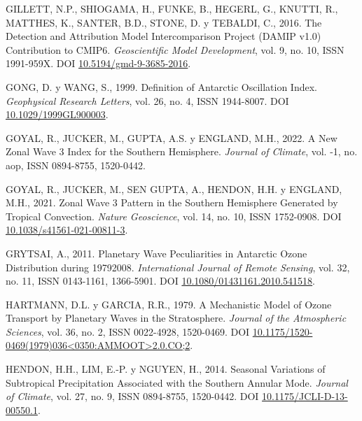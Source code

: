 \documentclass[12pt,oneside,a4paper]{reedthesis}
\newlength{\cslhangindent}
\newenvironment{CSLReferences}[2] %
 {%
  \setlength{\parindent}{0pt}
  \ifodd #1 \everypar{\setlength{\hangindent}{\cslhangindent}}\ignorespaces\fi
  \ifnum #2 > 0
  \setlength{\parskip}{#2\baselineskip}
  \fi
 }%
 {}
\begin{document}
\begin{CSLReferences}{1}{0}
\leavevmode{}%
GILLETT, N.P., SHIOGAMA, H., FUNKE, B., HEGERL, G., KNUTTI, R., MATTHES, K., SANTER, B.D., STONE, D. y TEBALDI, C., 2016. The {Detection} and {Attribution Model Intercomparison Project} ({DAMIP} v1.0) Contribution to {CMIP6}. \emph{Geoscientific Model Development}, vol. 9, no. 10, ISSN 1991-959X. DOI \href{https://doi.org/10.5194/gmd-9-3685-2016}{10.5194/gmd-9-3685-2016}.

\leavevmode{}%
GONG, D. y WANG, S., 1999. Definition of {Antarctic Oscillation} Index. \emph{Geophysical Research Letters}, vol. 26, no. 4, ISSN 1944-8007. DOI \href{https://doi.org/10.1029/1999GL900003}{10.1029/1999GL900003}.

\leavevmode{}%
GOYAL, R., JUCKER, M., GUPTA, A.S. y ENGLAND, M.H., 2022. A New Zonal Wave 3 Index for the {Southern Hemisphere}. \emph{Journal of Climate}, vol. -1, no. aop, ISSN 0894-8755, 1520-0442.

\leavevmode{}%
GOYAL, R., JUCKER, M., SEN GUPTA, A., HENDON, H.H. y ENGLAND, M.H., 2021. Zonal Wave 3 Pattern in the {Southern Hemisphere} Generated by Tropical Convection. \emph{Nature Geoscience}, vol. 14, no. 10, ISSN 1752-0908. DOI \href{https://doi.org/10.1038/s41561-021-00811-3}{10.1038/s41561-021-00811-3}.

\leavevmode{}%
GRYTSAI, A., 2011. Planetary Wave Peculiarities in {Antarctic} Ozone Distribution during 1979{\textendash}2008. \emph{International Journal of Remote Sensing}, vol. 32, no. 11, ISSN 0143-1161, 1366-5901. DOI \href{https://doi.org/10.1080/01431161.2010.541518}{10.1080/01431161.2010.541518}.

\leavevmode{}%
HARTMANN, D.L. y GARCIA, R.R., 1979. A {Mechanistic Model} of {Ozone Transport} by {Planetary Waves} in the {Stratosphere}. \emph{Journal of the Atmospheric Sciences}, vol. 36, no. 2, ISSN 0022-4928, 1520-0469. DOI \href{https://doi.org/10.1175/1520-0469(1979)036\%3C0350:AMMOOT\%3E2.0.CO;2}{10.1175/1520-0469(1979)036\textless0350:AMMOOT\textgreater2.0.CO;2}.

\leavevmode{}%
HENDON, H.H., LIM, E.-P. y NGUYEN, H., 2014. Seasonal {Variations} of {Subtropical Precipitation Associated} with the {Southern Annular Mode}. \emph{Journal of Climate}, vol. 27, no. 9, ISSN 0894-8755, 1520-0442. DOI \href{https://doi.org/10.1175/JCLI-D-13-00550.1}{10.1175/JCLI-D-13-00550.1}.


\end{CSLReferences}
\end{document}
